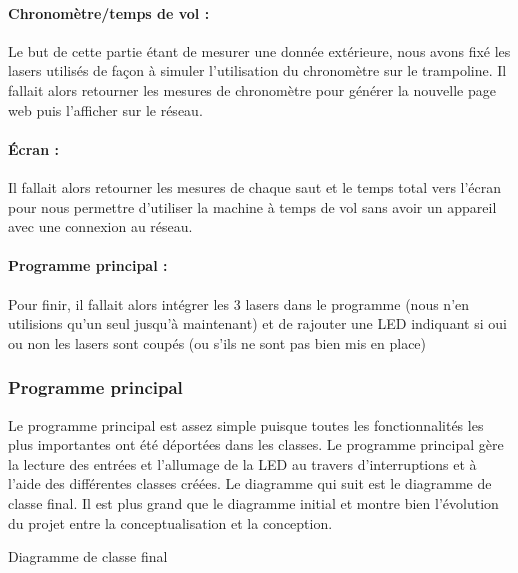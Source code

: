 \paragraph{Chronomètre/temps de vol :}
Le but de cette partie étant de mesurer une donnée extérieure, nous avons fixé les lasers utilisés de façon à simuler l’utilisation du chronomètre sur le trampoline. Il fallait alors retourner les mesures de chronomètre pour générer la nouvelle page web puis l’afficher sur le réseau.
\paragraph{Écran :}
Il fallait alors retourner les mesures de chaque saut et le temps total vers l’écran pour nous permettre d’utiliser la machine à temps de vol sans avoir un appareil avec une connexion au réseau.
\paragraph{Programme principal :}
Pour finir, il fallait alors intégrer les 3 lasers dans le programme (nous n’en utilisions qu’un seul jusqu’à maintenant) et de rajouter une LED indiquant si oui ou non les lasers sont coupés (ou s’ils ne sont pas bien mis en place)

\subsubsection{Programme principal}
Le programme principal est assez simple puisque toutes les fonctionnalités les plus importantes ont été déportées dans les classes. Le programme principal gère la lecture des entrées et l'allumage de la LED au travers d'interruptions et à l'aide des différentes classes créées. Le diagramme qui suit est le diagramme de classe final. Il est plus grand que le diagramme initial et montre bien l'évolution du projet entre la conceptualisation et la conception.

\begin{center}
  
  Diagramme de classe final
\end{center}

